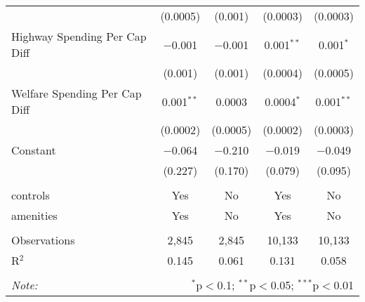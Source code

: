 \begin{table}[!htbp]
\begin{tabular}{@{\extracolsep{5pt}}lcccc}
  & (0.0005) & (0.001) & (0.0003) & (0.0003) \\ 
  Highway Spending Per Cap Diff & $-$0.001 & $-$0.001 & 0.001$^{**}$ & 0.001$^{*}$ \\ 
  & (0.001) & (0.001) & (0.0004) & (0.0005) \\ 
  Welfare Spending Per Cap Diff & 0.001$^{**}$ & 0.0003 & 0.0004$^{*}$ & 0.001$^{**}$ \\ 
  & (0.0002) & (0.0005) & (0.0002) & (0.0003) \\ 
  Constant & $-$0.064 & $-$0.210 & $-$0.019 & $-$0.049 \\ 
  & (0.227) & (0.170) & (0.079) & (0.095) \\ 
 \hline \\[-1.8ex] 
controls & Yes & No & Yes & No \\ 
amenities & Yes & No & Yes & No \\ 
\hline \\[-1.8ex] 
Observations & 2,845 & 2,845 & 10,133 & 10,133 \\ 
R$^{2}$ & 0.145 & 0.061 & 0.131 & 0.058 \\ 
\hline 
\hline \\[-1.8ex] 
\textit{Note:}  & \multicolumn{4}{r}{$^{*}$p$<$0.1; $^{**}$p$<$0.05; $^{***}$p$<$0.01} \\ 
\end{tabular} 
\end{table} 
